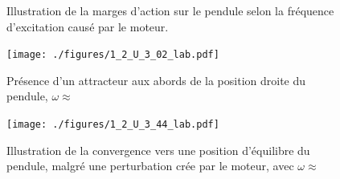 \documentclass[a4paper,12pt,oneside]{article}
\begin{document}

\begin{figure}[!ht]
    \hfill
    \caption{Illustration de la marges d'action sur le pendule selon la fréquence d'excitation causé par le moteur.}
    \label{fig:vitesse}
\end{figure}


\begin{figure}[h!]
  \begin{center}
  \texttt{[image: ./figures/1\_2\_U\_3\_02\_lab.pdf]}
  \caption{Présence d'un attracteur aux abords de la position droite du pendule, $\omega \approx$} \label{fig:1_2_U_3_02_lab}
  \end{center}
\end{figure}


\begin{figure}[h!]
  \begin{center}
  \texttt{[image: ./figures/1\_2\_U\_3\_44\_lab.pdf]}
  \caption{Illustration de la convergence vers une position d'équilibre du pendule, malgré une perturbation crée par le moteur, avec $\omega \approx$} \label{fig:1_2_U_3_44_lab}
  \end{center}
\end{figure}

\end{document}
